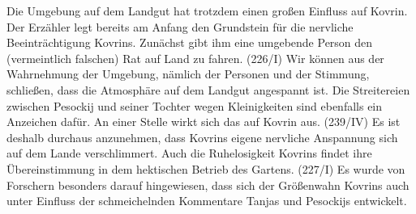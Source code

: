 \documentclass{../../sem_paper}
\begin{document}
Die Umgebung auf dem Landgut hat trotzdem einen großen Einfluss auf Kovrin. Der Erzähler legt
bereits am Anfang den Grundstein für die nervliche Beeinträchtigung Kovrins. Zunächst gibt ihm
eine umgebende Person den (vermeintlich falschen) Rat auf Land zu fahren. (226/I) Wir können aus der Wahrnehmung der Umgebung,
nämlich der Personen und der Stimmung, schließen, dass die Atmosphäre auf dem Landgut
angespannt ist. Die Streitereien zwischen Pesockij und seiner Tochter wegen Kleinigkeiten sind
ebenfalls ein Anzeichen dafür. An einer Stelle wirkt sich das auf Kovrin aus. (239/IV) Es
ist deshalb durchaus anzunehmen, dass Kovrins eigene nervliche Anspannung sich auf dem Lande
verschlimmert. Auch die Ruhelosigkeit Kovrins findet ihre Übereinstimmung in dem hektischen
Betrieb des Gartens. (227/I) Es wurde von
Forschern besonders darauf hingewiesen, dass sich der Größenwahn Kovrins auch unter Einfluss
der schmeichelnden Kommentare Tanjas und Pesockijs entwickelt.\autocite{alekseev}
\end{document}
